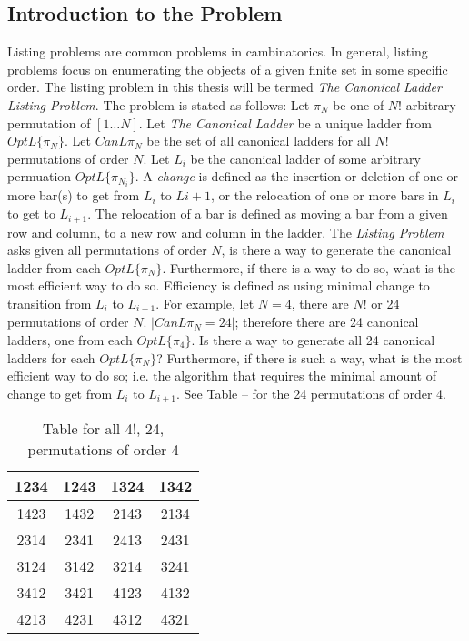 \subsection{Introduction to the Problem}
Listing problems are common problems in cambinatorics. In general, listing problems 
focus on enumerating the objects of a given finite set in some specific order. The listing problem in this thesis 
will be termed \emph{The Canonical Ladder Listing Problem}. The problem is stated as follows: Let $\pi_{N}$ be one of $N!$ arbitrary permutation of $[1 \dots N]$. 
Let \emph{The Canonical Ladder} be a unique ladder from $OptL\{\pi_{N}\}$. Let $CanL{\pi_{N}}$ be the set of all canonical ladders for 
all $N!$ permutations of order $N$. Let $L_{i}$ be the canonical ladder of some arbitrary permuation $OptL\{\pi_{N_{i}}\}$. A \emph{change} is defined as the insertion or 
deletion of one or more bar(s) to get from $L_{i}$ to $L{i+1}$, or the relocation of one or more bars in $L_{i}$ to get to $L_{i+1}$. The relocation of a bar 
is defined as moving a bar from a given row and column, to a new row and column in the ladder. The \emph{Listing Problem} asks given all permutations of 
order $N$, is there a way to generate the canonical ladder from each $OptL\{\pi_{N}\}$. 
Furthermore, if there is a way to do so, what is the most efficient way to do so. Efficiency is defined as 
using minimal change to transition from $L_{i}$ to $L_{i+1}$. For example, let $N=4$, there are $N!$ or 24 permutations 
of order $N$. $|CanL{\pi_{N}}=24|$; therefore there are 24 canonical ladders, one from each $OptL\{\pi_{4}\}$. Is there a way to generate 
all 24 canonical ladders for each $OptL\{\pi_{N}\}$? Furthermore, if there is such a way, what is the most efficient way 
to do so; i.e. the algorithm that requires the minimal amount of change to get from $L_{i}$ to $L_{i+1}$. See Table -- for 
the 24 permutations of order 4.
\begin{table}[]
    \begin{center}
       \begin{tabular}{|c |c |c |c |}
        \hline
        1234 & 1243 & 1324 & 1342 \\ \hline
        1423 & 1432 & 2143 & 2134 \\ \hline 
        2314 & 2341 & 2413 & 2431 \\ \hline 
        3124 & 3142 & 3214 & 3241 \\ \hline 
        3412 & 3421 & 4123 & 4132 \\ \hline 
        4213 & 4231 & 4312 & 4321 \\ \hline 
        
    \end{tabular}
    \caption{Table for all 4!, 24, permutations of order 4} 
    \end{center}

 \end{table}



